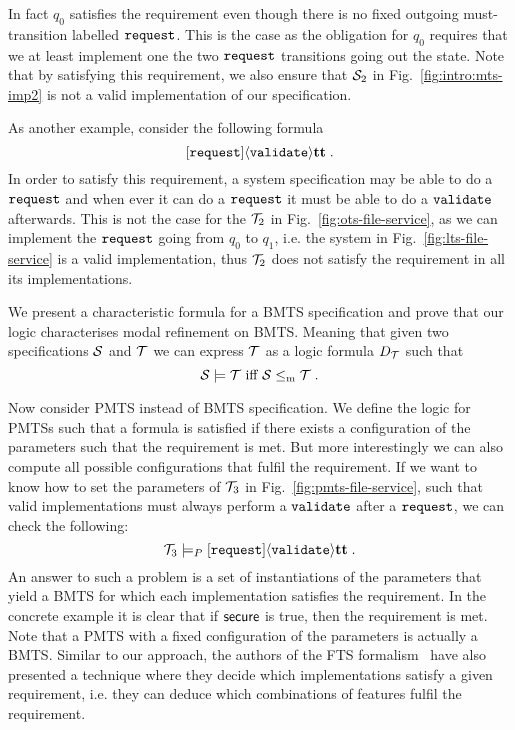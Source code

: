 In fact $q_0$ satisfies the requirement even though there is no fixed outgoing must-transition labelled $\transition{request}$. This is the case as the obligation for $q_0$ requires that we at least implement one the two $\transition{request}$ transitions going out the state. Note that by satisfying this requirement, we also ensure that $\S_2$ in Fig.~\ref{fig:intro:mts-imp2} is not a valid implementation of our specification.

As another example, consider the following formula
\[
    \lbox{\transition{request}}\ldia{\transition{validate}}\true\;.
\]
In order to satisfy this requirement, a system specification may be able to do a $\transition{request}$ and when ever it can do a $\transition{request}$ it must be able to do a $\transition{validate}$ afterwards. This is not the case for the $\T_2$ in Fig.~\ref{fig:ots-file-service}, as we can implement the $\transition{request}$ going from $q_0$ to $q_1$, i.e. the system in Fig.~\ref{fig:lts-file-service} is a valid implementation, thus $\T_2$ does not satisfy the requirement in all its implementations. 

 
\begin{result}
    We present a characteristic formula for a BMTS specification and prove that our logic characterises modal refinement on BMTS. Meaning that given two specifications $\S$ and $\T$ we can express $\T$ as a logic formula $D_\T$ such that
    \[
        \S \models \T \text{ iff } \S \mr \T\;.
    \]
\end{result}

Now consider PMTS instead of BMTS specification. We define the logic for PMTSs such that a formula is satisfied if there exists a configuration of the parameters such that the requirement is met. But more interestingly we can also compute all possible configurations that fulfil the requirement. 
If we want to know how to set the parameters of $\T_3$ in Fig.~\ref{fig:pmts-file-service}, such that valid implementations  must always perform a $\transition{validate}$ after a $\transition{request}$, we can check the following:
\[
\T_3 \modelsp \lbox{\transition{request}}\ldia{\transition{validate}}\true\;.
\]
An answer to such a problem is a set of instantiations of the parameters that yield a BMTS for which each implementation satisfies the requirement. In the concrete example it is clear that if $
\parameter{secure}$ is true, then the requirement is met.
Note that a PMTS with a fixed configuration of the parameters is actually a BMTS.
Similar to our approach, the authors of the FTS formalism~\cite{Classen2010} have also presented a technique where they decide which implementations satisfy a given requirement, i.e. they can deduce which combinations of features fulfil the requirement.


